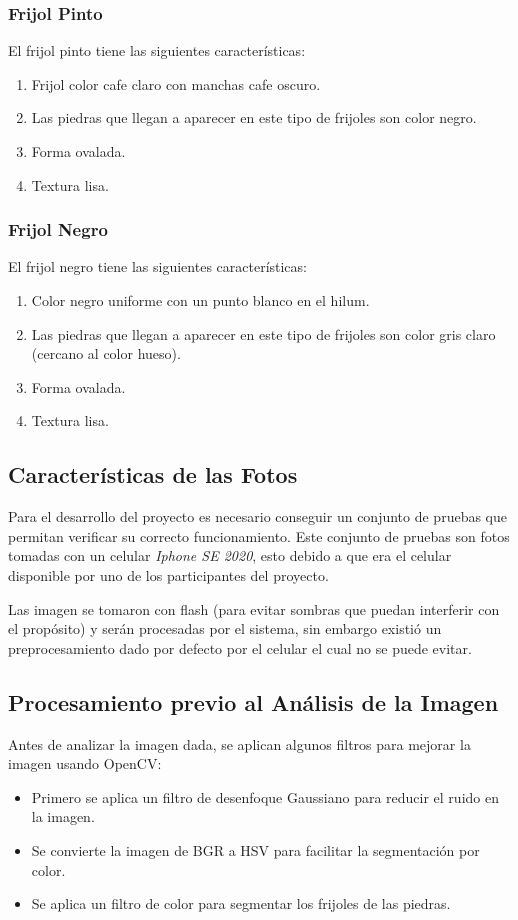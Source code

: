 \documentclass[conference]{IEEEtran}
\begin{document}
    \subsubsection{Frijol Pinto}
    El frijol pinto tiene las siguientes características:
    \begin{enumerate}
        \item Frijol color cafe claro con manchas cafe oscuro.
        \item Las piedras que llegan a aparecer en este tipo de frijoles son color negro.
        \item Forma ovalada.
        \item Textura lisa.
    \end{enumerate}

    \subsubsection{Frijol Negro}
    El frijol negro tiene las siguientes características:
    \begin{enumerate}
        \item Color negro uniforme con un punto blanco en el hilum\cite{semillas}.
        \item Las piedras que llegan a aparecer en este tipo de frijoles son color gris claro (cercano al color hueso\cite{pantone}).
        \item Forma ovalada.
        \item Textura lisa.
    \end{enumerate}

    \subsection{Características de las Fotos}
    Para el desarrollo del proyecto es necesario conseguir un conjunto de pruebas que permitan verificar su correcto funcionamiento. Este conjunto de pruebas son fotos tomadas con un celular \textit{Iphone SE 2020}\cite{iphone}, esto debido a que era el celular disponible por uno de los participantes del proyecto.

    Las imagen se tomaron con flash (para evitar sombras que puedan interferir con el propósito) y serán procesadas por el sistema, sin embargo existió un preprocesamiento dado por defecto por el celular el cual no se puede evitar.

    \subsection{Procesamiento previo al Análisis de la Imagen}
    Antes de analizar la imagen dada, se aplican algunos filtros para mejorar la imagen usando OpenCV\cite{opencv}:
    \begin{itemize}
        \item Primero se aplica un filtro de desenfoque Gaussiano para reducir el ruido en la imagen.
        \item Se convierte la imagen de BGR a HSV para facilitar la segmentación por color.
        \item Se aplica un filtro de color para segmentar los frijoles de las piedras.
    \end{itemize}
\end{document}
